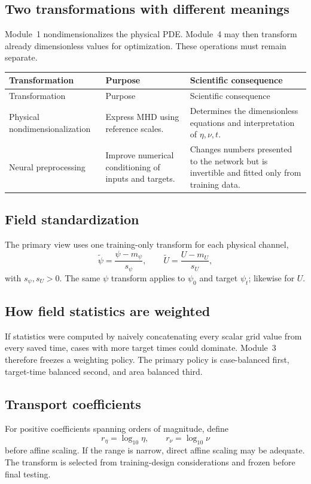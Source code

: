 \documentclass[11pt]{article}
\begin{document}
\subsection{Two transformations with different meanings}
Module~1 nondimensionalizes the physical PDE. Module~4 may then transform already dimensionless values for optimization. These operations must remain separate.

\begin{longtable}{p{}p{}p{}}
\toprule
Transformation & Purpose & Scientific consequence \\
\midrule
\endfirsthead
\toprule
Transformation & Purpose & Scientific consequence \\
\midrule
\endhead
Physical nondimensionalization & Express MHD using reference scales. & Determines the dimensionless equations and interpretation of $\eta,\nu,t$. \\
Neural preprocessing & Improve numerical conditioning of inputs and targets. & Changes numbers presented to the network but is invertible and fitted only from training data. \\
\bottomrule
\end{longtable}

\subsection{Field standardization}
The primary view uses one training-only transform for each physical channel,
\[
\widetilde\psi=\frac{\psi-m_\psi}{s_\psi},\qquad
\widetilde U=\frac{U-m_U}{s_U},
\]
with $s_\psi,s_U>0$. The same $\psi$ transform applies to $\psi_0$ and target $\psi_t$; likewise for $U$.

\subsection{How field statistics are weighted}
If statistics were computed by naively concatenating every scalar grid value from every saved time, cases with more target times could dominate. Module~3 therefore freezes a weighting policy. The primary policy is case-balanced first, target-time balanced second, and area balanced third.

\subsection{Transport coefficients}
For positive coefficients spanning orders of magnitude, define
\[
r_\eta=\log_{10}\eta,\qquad r_\nu=\log_{10}\nu
\]
before affine scaling. If the range is narrow, direct affine scaling may be adequate. The transform is selected from training-design considerations and frozen before final testing.
\end{document}
